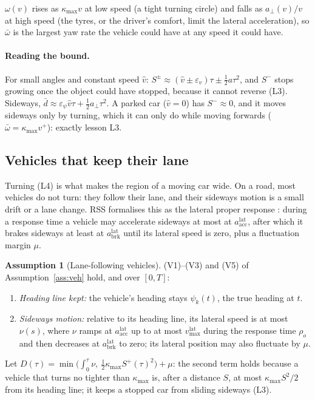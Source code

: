 \documentclass[11pt]{article}
\theoremstyle{definition}
\newtheorem{assumption}{Assumption}
\theoremstyle{remark}
\begin{document}
$\omega(v)$ rises as $\kappa_{\max}v$ at low speed (a tight turning circle) and falls as $a_\perp(v)/v$ at
high speed (the tyres, or the driver's comfort, limit the lateral acceleration), so $\bar\omega$ is the
largest yaw rate the vehicle could have at any speed it could have.

\paragraph{Reading the bound.} For small angles and constant speed $\hat v$: $S^\pm\approx(\hat v\pm\varepsilon_v)\tau\pm\tfrac12a\tau^2$,
and $S^-$ stops growing once the object could have stopped, because it cannot reverse (L3). Sideways,
$\bar d\approx\varepsilon_\psi\hat v\tau+\tfrac12a_\perp\tau^2$. A parked car ($\hat v=0$) has $S^-\approx0$,
and it moves sideways only by turning, which it can only do while moving forwards
($\bar\omega=\kappa_{\max}v^+$): exactly lesson L3.

\subsection{Vehicles that keep their lane}
Turning (L4) is what makes the region of a moving car wide. On a road, most vehicles do not turn: they
follow their lane, and their sideways motion is a small drift or a lane change. RSS formalises this as
the lateral proper response \cite{rss2017}: during a response time a vehicle may accelerate sideways at
most at $a^{\mathrm{lat}}_{\mathrm{acc}}$, after which it brakes sideways at least at $a^{\mathrm{lat}}_{\mathrm{brk}}$
until its lateral speed is zero, plus a fluctuation margin $\mu$.

\begin{assumption}[Lane-following vehicles]\label{ass:lane}
(V1)--(V3) and (V5) of Assumption~\ref{ass:veh} hold, and over $[0,T]$:
\begin{enumerate}[label=(F\arabic*),leftmargin=*]
  \item \emph{Heading line kept:} the vehicle's heading stays $\psi_k(t)$, the true heading at $t$.
  \item \emph{Sideways motion:} relative to its heading line, its lateral speed is at most $\nu(s)$, where
    $\nu$ ramps at $a^{\mathrm{lat}}_{\mathrm{acc}}$ up to at most $v^{\mathrm{lat}}_{\max}$ during the response time
    $\rho_o$ and then decreases at $a^{\mathrm{lat}}_{\mathrm{brk}}$ to zero; its lateral position may also
    fluctuate by $\mu$.
\end{enumerate}
\end{assumption}
Let $D(\tau)=\min\big(\int_0^\tau\nu,\ \tfrac12\kappa_{\max}S^+(\tau)^2\big)+\mu$: the second term holds because a
vehicle that turns no tighter than $\kappa_{\max}$ is, after a distance $S$, at most $\kappa_{\max}S^2/2$
from its heading line; it keeps a stopped car from sliding sideways (L3).
\end{document}
